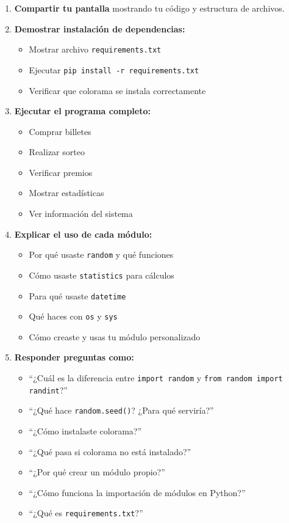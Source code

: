 \documentclass[12pt,a4paper]{article}
\begin{document}
\begin{enumerate}[leftmargin=*]
    \item \textbf{Compartir tu pantalla} mostrando tu código y estructura de archivos.
    
    \item \textbf{Demostrar instalación de dependencias:}
    \begin{itemize}
        \item Mostrar archivo \texttt{requirements.txt}
        \item Ejecutar \texttt{pip install -r requirements.txt}
        \item Verificar que colorama se instala correctamente
    \end{itemize}
    
    \item \textbf{Ejecutar el programa completo:}
    \begin{itemize}
        \item Comprar billetes
        \item Realizar sorteo
        \item Verificar premios
        \item Mostrar estadísticas
        \item Ver información del sistema
    \end{itemize}
    
    \item \textbf{Explicar el uso de cada módulo:}
    \begin{itemize}
        \item Por qué usaste \texttt{random} y qué funciones
        \item Cómo usaste \texttt{statistics} para cálculos
        \item Para qué usaste \texttt{datetime}
        \item Qué haces con \texttt{os} y \texttt{sys}
        \item Cómo creaste y usas tu módulo personalizado
    \end{itemize}
    
    \item \textbf{Responder preguntas como:}
    \begin{itemize}
        \item ``¿Cuál es la diferencia entre \texttt{import random} y \texttt{from random import randint}?''
        \item ``¿Qué hace \texttt{random.seed()}? ¿Para qué serviría?''
        \item ``¿Cómo instalaste colorama?''
        \item ``¿Qué pasa si colorama no está instalado?''
        \item ``¿Por qué crear un módulo propio?''
        \item ``¿Cómo funciona la importación de módulos en Python?''
        \item ``¿Qué es \texttt{requirements.txt}?''
    \end{itemize}
    

\end{enumerate}
\end{document}
